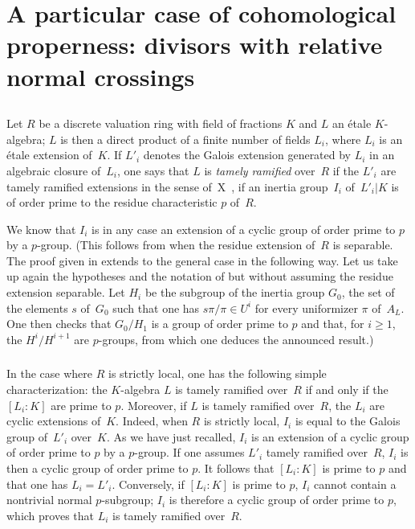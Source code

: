 \section[A particular case of cohomological properness]{A particular case of cohomological properness: divisors
with relative normal crossings}
\label{XIII.2}

\setcounter{subsection}{-1}

\subsection{}
\label{XIII.2.0}
Let $R$ be a discrete valuation ring with field of fractions
$K$ and $L$ an étale $K$-algebra; $L$ is then a direct product
of a finite number of fields $L_i$, where $L_i$ is an étale
extension of~$K$. If $L'_i$ denotes the Galois extension
generated by $L_i$ in an algebraic closure of~$L_i$,
one says that $L$ is \emph{tamely ramified}
over~$R$ if the $L'_i$ are tamely
ramified extensions in the sense of~X~, \ie if an inertia group~$I_i$ of~$L'_i|K$ is of order prime to the residue
characteristic $p$ of~$R$.

We know that $I_i$ is in any case an extension of a cyclic group
of order prime to $p$ by a $p$-group. (This follows from \cite[ch\ptbl IV prop cor]{XIII.5} when the residue extension of~$R$ is
separable. The proof given in
\loccit extends to the general case in the following
way. Let us take up again the hypotheses and the notation of
\loccit but without assuming the residue extension
separable. Let $H_i$ be the subgroup of the inertia group $G_0$,
the set of the elements $s$ of~$G_0$ such that one has $s \pi /
\pi \in U^i$ for every uniformizer $\pi$ of~$A_L$. One then checks
that $G_0/H_1$ is a group of order prime to $p$ and that,
for $i \geqslant 1$, the $H^i/H^{i+1}$ are $p$-groups, from which
one deduces the announced result.)

\subsubsection{}
\label{XIII.2.0.1}
In the case where $R$ is strictly local, one has the following
simple characterization: the $K$-algebra $L$ is
tamely ramified over~$R$ if and only if the
$[L_i:K]$ are prime to $p$. Moreover, if $L$ is
tamely ramified over~$R$, the $L_i$ are cyclic extensions
of~$K$. Indeed, when $R$ is strictly local, $I_i$
is equal to the Galois group
of~$L'_i$ over~$K$. As we have just recalled, $I_i$ is an extension
of a cyclic group of order prime to $p$ by a $p$-group. If
one assumes $L'_i$ tamely ramified over~$R$, $I_i$ is
then a cyclic group of order prime to $p$. It follows
that $[L_i:K]$ is prime to $p$ and that one has $L_i =
L'_i$. Conversely, if $[L_i:K]$ is prime to $p$, $I_i$ cannot
contain a nontrivial normal $p$-subgroup; $I_i$ is therefore
a cyclic group of order prime to $p$, which proves that $L_i$
is tamely ramified over~$R$.

